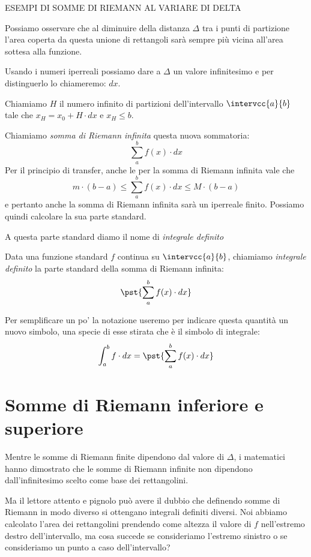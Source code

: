 ESEMPI DI SOMME DI RIEMANN AL VARIARE DI DELTA %

Possiamo osservare che al diminuire della distanza \(\Delta\) tra i punti di 
partizione l'area coperta da questa unione di rettangoli sarà sempre più 
vicina all'area sottesa alla funzione.

Usando i numeri iperreali possiamo dare a \(\Delta\) un valore infinitesimo e 
per distinguerlo lo chiameremo: \(dx\).

Chiamiamo \(H\) il numero infinito di partizioni dell'intervallo 
\(\intervcc{a}{b}\) tale che \(x_H = x_0 + H \cdot dx\) e \(x_H \le b\).

Chiamiamo \emph{somma di Riemann infinita} questa nuova sommatoria:
\[\sum_a^b f(x) \cdot dx\]
Per il principio di transfer, anche le per la somma di Riemann infinita vale 
che 
\[m \cdot (b - a) \le  \sum_a^b f(x) \cdot dx  \le M\cdot(b - a)\]
e pertanto anche la somma di Riemann infinita sarà un iperreale finito. 
Possiamo quindi calcolare la sua parte standard. 

A questa parte standard diamo il nome di \emph{integrale definito}
\begin{definizione}
Data una funzione standard \(f\) continua su \(\intervcc{a}{b}\),
chiamiamo \emph{integrale definito} la parte standard della 
somma di Riemann infinita:
\[\pst{\sum_a^b f(x) \cdot dx}\]
\end{definizione}

Per semplificare un po' la notazione useremo per indicare questa quantità un 
nuovo simbolo, una specie di esse stirata che è il simbolo di integrale:
\[\int_a^b f \cdot dx = \pst{\sum_a^b f(x) \cdot dx}\]

\section{Somme di Riemann inferiore e superiore}
\label{sec:integrali_somme_riemann}

Mentre le somme di Riemann finite dipendono dal valore di \(\Delta\), i 
matematici hanno dimostrato che le somme di Riemann infinite non dipendono 
dall'infinitesimo scelto come base dei rettangolini.

Ma il lettore attento e pignolo può avere il dubbio che definendo somme di 
Riemann in modo diverso si ottengano integrali definiti diversi. Noi abbiamo 
calcolato l'area dei rettangolini prendendo come altezza il valore di \(f\) 
nell'estremo destro dell'intervallo, ma cosa succede se consideriamo 
l'estremo sinistro o se consideriamo un punto a caso dell'intervallo?


